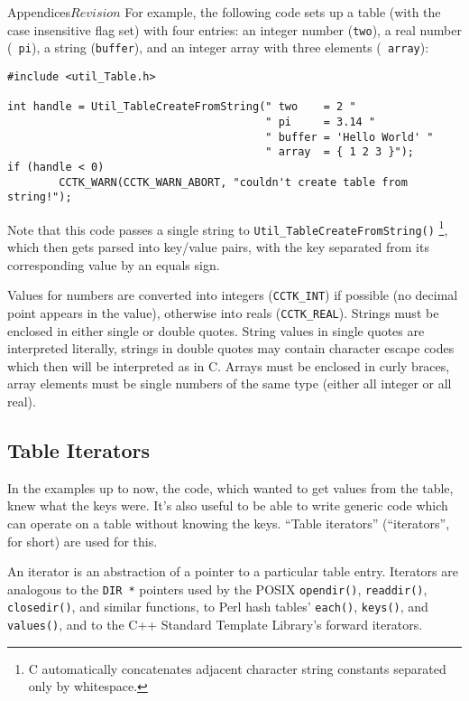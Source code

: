 \begin{cactuspart}{Appendices}{}{$Revision$}
For example, the following code sets up a table (with the case insensitive flag
set) with four entries: an integer number ({\tt two}), a real number ({\tt
pi}), a string ({\tt buffer}), and an integer array with three elements ({\tt
array}):

\begin{verbatim}
#include <util_Table.h>

int handle = Util_TableCreateFromString(" two    = 2 "
                                        " pi     = 3.14 "
                                        " buffer = 'Hello World' "
                                        " array  = { 1 2 3 }");
if (handle < 0)
        CCTK_WARN(CCTK_WARN_ABORT, "couldn't create table from string!");
\end{verbatim}

Note that this code passes a single string to
\verb|Util_TableCreateFromString()|%
\footnote{C automatically concatenates
adjacent character string constants separated only by whitespace.}, 
which then gets parsed into key/value pairs, with the key separated from its
corresponding value by an equals sign.

Values for numbers are converted into integers ({\tt CCTK\_INT}) if possible
(no decimal point appears in the value), otherwise into reals ({\tt CCTK\_REAL}).
Strings must be enclosed in either single or double quotes. String values in
single quotes are interpreted literally, strings in double quotes may contain
character escape codes which then will be interpreted as in C.
Arrays must be enclosed in curly braces, array elements must be single numbers
of the same type (either all integer or all real).


\subsection{Table Iterators}
\label{sect-UtilityRoutines/tables/table-iterators}

In the examples up to now, the code, which wanted to get values from
the table, knew what the keys were.  It's also useful to be able to
write generic code which can operate on a table without knowing the
keys.  ``Table iterators'' (``iterators'', for short) are used for this.

An iterator is an abstraction of a pointer to a particular table entry.
Iterators are analogous to the \verb|DIR *| pointers used by the POSIX
\verb|opendir()|, \verb|readdir()|, \verb|closedir()|, and similar
functions, to Perl hash tables' \verb|each()|, \verb|keys()|,
and \verb|values()|, and to the C++ Standard Template Library's
forward iterators.


\end{cactuspart}
